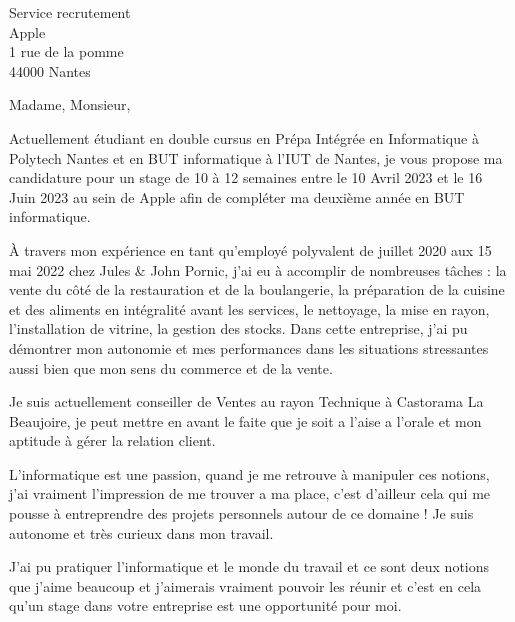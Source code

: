 \documentclass[
    french,
    sender,
    paper=a4,
    version=last,
    fontsize=9pt,
    DIV=12,
    BCOR=0mm
]{scrlttr2}
\begin{document}




\begin{letter}{
    Service recrutement\\
    Apple\\
    1 rue de la pomme\\
    44000 Nantes
}

\opening{Madame, Monsieur,}


Actuellement étudiant en double cursus en Prépa Intégrée en Informatique à Polytech Nantes et en BUT informatique à l’IUT de Nantes, je vous propose ma candidature pour un stage de 10 à 12 semaines entre le 10 Avril 2023 et le 16 Juin 2023 au sein de Apple afin de compléter ma deuxième année en BUT informatique. 

À travers mon expérience en tant qu’employé polyvalent de juillet 2020 aux 15 mai 2022 chez Jules \& John Pornic, j’ai eu à accomplir de nombreuses tâches : la vente du côté de la restauration et de la boulangerie, la préparation de la cuisine et des aliments en intégralité avant les services, le nettoyage, la mise en rayon, l’installation de vitrine, la gestion des stocks. Dans cette entreprise, j’ai pu démontrer mon autonomie et mes performances dans les situations stressantes aussi bien que mon sens du commerce et de la vente.

Je suis actuellement conseiller de Ventes au rayon Technique à Castorama La Beaujoire, je peut mettre en avant le faite que je soit a l'aise a l'orale et mon aptitude à gérer la relation client.

L’informatique est une passion, quand je me retrouve à manipuler ces notions, j’ai vraiment l'impression de me trouver a ma place, c’est d’ailleur cela qui me pousse à entreprendre des projets personnels autour de ce domaine ! Je suis autonome et très curieux  dans mon travail.

J’ai pu pratiquer l’informatique et le monde du travail et ce sont deux notions que j’aime beaucoup et j’aimerais vraiment pouvoir les réunir et c’est en cela qu’un stage dans votre entreprise est une opportunité pour moi.


\end{letter}
\end{document}
